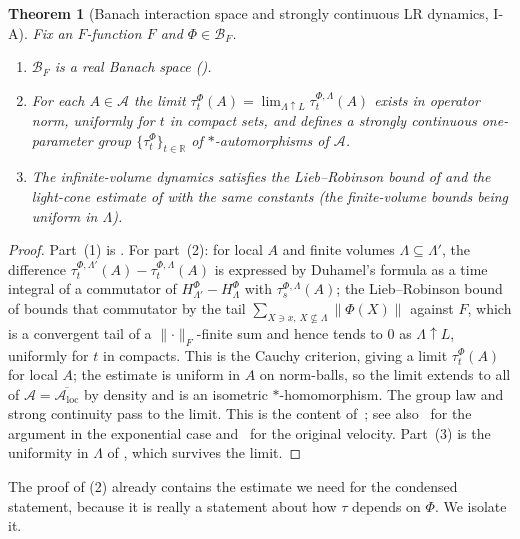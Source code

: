 \documentclass[12pt]{article}
\newcommand{\Ffun}{F}                          %
\newcommand{\BF}{\mathcal{B}_{F}}              %
\newcommand{\qA}{\mathcal{A}}
\newcommand{\norm}[1]{\lVert #1\rVert}
\newcommand{\Fnorm}[1]{\lVert #1\rVert_{F}}
\newcommand{\loc}{\mathrm{loc}}
\newcommand{\R}{\mathbb{R}}
\newtheorem{theorem}{Theorem}[section]
\theoremstyle{definition}
\theoremstyle{remark}
\begin{document}
\begin{theorem}[Banach interaction space and strongly continuous LR dynamics, I-A]
\label{thm:banach}
Fix an $\Ffun$-function $\Ffun$ and $\Phi\in\BF$.
\begin{enumerate}
\item $\BF$ is a real Banach space ().
\item For each $A\in\qA$ the limit
  $\tau^\Phi_t(A)=\lim_{\Lambda\uparrow L}\tau^{\Phi,\Lambda}_t(A)$
  exists in operator norm, uniformly for $t$ in compact sets, and defines a strongly
  continuous one-parameter group $\{\tau^\Phi_t\}_{t\in\R}$ of $*$-automorphisms of $\qA$.
\item The infinite-volume dynamics satisfies the Lieb--Robinson bound of
   and the light-cone estimate of  with the same
  constants (the finite-volume bounds being uniform in $\Lambda$).
\end{enumerate}
\end{theorem}
\begin{proof}
Part~(1) is . For part~(2): for local $A$ and finite volumes
$\Lambda\subseteq\Lambda'$, the difference $\tau^{\Phi,\Lambda'}_t(A)-\tau^{\Phi,\Lambda}_t(A)$
is expressed by Duhamel's formula as a time integral of a commutator of
$H^\Phi_{\Lambda'}-H^\Phi_\Lambda$ with $\tau^{\Phi,\Lambda}_{s}(A)$; the Lieb--Robinson bound
of  bounds that commutator by the tail $\sum_{X\ni x,\,X\not\subseteq
\Lambda}\norm{\Phi(X)}$ against $\Ffun$, which is a convergent tail of a $\Fnorm{\cdot}$-finite
sum and hence tends to $0$ as $\Lambda\uparrow L$, uniformly for $t$ in compacts. This is the
Cauchy criterion, giving a limit $\tau^\Phi_t(A)$ for local $A$; the estimate is uniform in
$A$ on norm-balls, so the limit extends to all of $\qA=\overline{\qA_\loc}$ by density and is
an isometric $*$-homomorphism. The group law and strong continuity pass to the limit. This is
the content of~\cite[\S3--4]{nsy-quasilocality-1}; see also~\cite{hastings-locality} for the
argument in the exponential case and~\cite{lieb-robinson-1972} for the original velocity.
Part~(3) is the uniformity in $\Lambda$ of , which survives
the limit.
\end{proof}

The proof of (2) already contains the estimate we need for the condensed
statement, because it is really a statement about how $\tau$ depends on $\Phi$. We isolate it.
\end{document}
